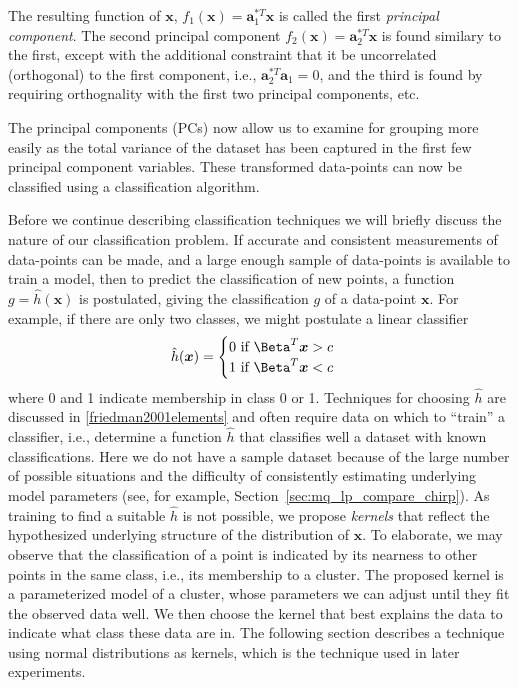 The resulting function of $\boldsymbol{x}$,
$f_1(\boldsymbol{x})=\boldsymbol{a}_{1}^{\ast T}\boldsymbol{x}$ is called the first
\textit{principal component}. The second principal component
$f_2(\boldsymbol{x})=\boldsymbol{a}_{2}^{\ast T}\boldsymbol{x}$ is found similary
to the first, except with the additional constraint that it be uncorrelated
(orthogonal) to the first component, i.e.,
$\boldsymbol{a}_{2}^{\ast T}\boldsymbol{a}_{1}=0$, and the third is found by
requiring orthognality with the first two principal components, etc.

The principal components (PCs) now allow us to examine for grouping more easily as the
total variance of the dataset has been captured in the first few principal component
variables. These transformed data-points can now be classified using a
classification algorithm.

Before we continue describing classification techniques we will briefly discuss
the nature of our classification problem. If accurate and consistent
measurements of data-points can be made, and a large enough sample of
data-points is available to train a model, then to predict the classification of
new points, a function $g=\hat{h} \left( \boldsymbol{x} \right)$ is postulated,
giving the classification $g$ of a data-point $\boldsymbol{x}$. For example, if
there are only two classes, we might postulate a linear
classifier
\[
    \hat{h}(\boldsymbol{x}) = \begin{cases}
        0 \text{ if } \boldsymbol{\Beta}^{T}\boldsymbol{x} > c \\
        1 \text{ if } \boldsymbol{\Beta}^{T}\boldsymbol{x} < c
    \end{cases}
\]
where 0 and 1 indicate membership in class 0 or 1. Techniques for choosing
$\hat{h}$ are discussed in \ref{friedman2001elements} and often require data on
which to ``train'' a classifier, i.e., determine a function $\hat{h}$ that
classifies well a dataset with known classifications.  Here we do not have a
sample dataset because of the large number of possible situations and the
difficulty of consistently estimating underlying model parameters (see, for
example, Section~\ref{sec:mq_lp_compare_chirp}). As training to find a suitable
$\hat{h}$ is not possible, we propose \textit{kernels} that reflect the
hypothesized underlying structure of the distribution of $\boldsymbol{x}$. To
elaborate, we may observe that the classification of a
point is indicated by its nearness to other points in the same class, i.e., its
membership to a cluster. The proposed kernel is a parameterized model of a
cluster, whose parameters we can adjust until they fit the observed data well.
We then choose the kernel that best explains the data to indicate what class
these data are in. The following section describes a technique using normal
distributions as kernels, which is the technique used in later experiments.

